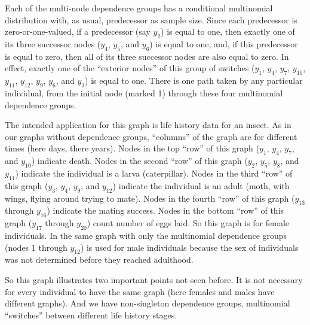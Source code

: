 Each of the multi-node dependence groups has a conditional multinomial
distribution with, as usual, predecessor as sample size.  Since each
predecessor is zero-or-one-valued, if a predecessor (say $y_2$) is
equal to one, then exactly one of its three successor nodes ($y_4$, $y_5$,
and $y_6$) is equal to one, and, if this predecessor
is equal to zero, then all of its three successor nodes are also equal to zero.
In effect, exactly one of the ``exterior nodes'' of this group of switches
($y_1$, $y_4$, $y_7$, $y_{10}$, $y_{11}$, $y_{12}$, $y_9$, $y_6$, and $y_3$)
is equal to one.  There is one path taken by any particular individual,
from the initial node (marked 1) through these four multinomial dependence
groups.

The intended application for this graph \citep{aster-hornworm} is life history
data for an insect.  As in our graphs without dependence groups,
``columns'' of the graph are for different
times (here days, there years).
Nodes in the top ``row'' of this graph ($y_1$, $y_4$, $y_7$, and $y_{10}$)
indicate death.
Nodes in the second ``row'' of this graph ($y_2$, $y_5$, $y_8$, and $y_{11}$)
indicate the individual is a larva (caterpillar).
Nodes in the third ``row'' of this graph ($y_3$, $y_4$, $y_9$, and $y_{12}$)
indicate the individual is an adult (moth, with wings, flying around trying
to mate).
Nodes in the fourth ``row'' of this graph ($y_{13}$ through $y_{16}$)
indicate the mating success.
Nodes in the bottom ``row'' of this graph ($y_{17}$ through $y_{20}$)
count number of eggs laid.  So this graph is for female individuals.
In \citet{aster-hornworm} the same graph with only the multinomial dependence
groups (nodes 1 through $y_{12}$) is used for male individuals because
the sex of individuals was not determined before they reached adulthood.

So this graph illustrates two important points not seen before.
It is not necessary for every individual to
have the same graph (here females and males have different graphs).
And we have non-singleton dependence groups,
multinomial ``switches'' between different life history stages.

